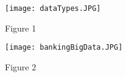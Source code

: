 \documentclass[sigconf]{acmart}
\begin{document}
\begin{figure}[p!]
    \texttt{[image: dataTypes.JPG]}
    \caption{Figure 1}
    \label{fig:figure1}
\end{figure}

\begin{figure}[p!]
    \texttt{[image: bankingBigData.JPG]}
    \caption{Figure 2}
    \label{fig:figure2}
\end{figure}


 
\end{document}
